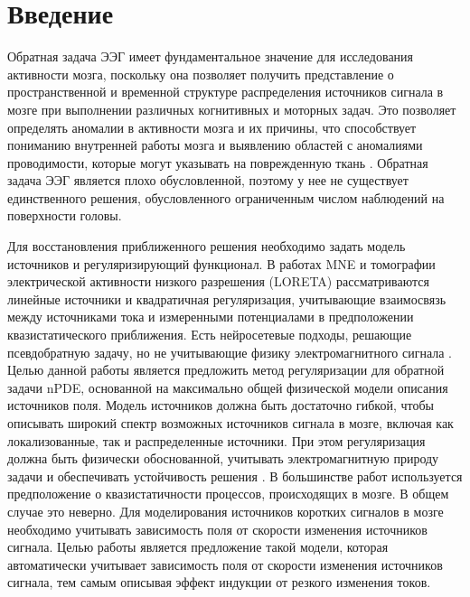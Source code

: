 \documentclass[a4paper,14pt,oneside,openany]{extarticle}
\begin{document}

%

\newpage


\newpage
\begingroup
\hypersetup{linkcolor=black}
\tableofcontents
\endgroup

\newpage
\section{Введение}

Обратная задача ЭЭГ имеет фундаментальное значение для исследования активности мозга, 
поскольку она позволяет получить представление о пространственной и временной структуре 
распределения источников сигнала в мозге при выполнении
различных когнитивных и моторных задач. Это позволяет определять аномалии в активности 
мозга и их причины, что способствует пониманию внутренней работы мозга и выявлению 
областей с аномалиями проводимости, которые могут указывать на 
поврежденную ткань \cite{PascualMarqui2001}. Обратная задача ЭЭГ является плохо обусловленной, 
поэтому у нее не существует единственного решения, обусловленного ограниченным 
числом наблюдений на поверхности головы.

Для восстановления приближенного решения необходимо задать модель источников 
и регуляризирующий функционал. В работах MNE \cite{Grech2008} и томографии 
электрической активности низкого разрешения (LORETA) \cite{Weinstein1999}
рассматриваются линейные источники и квадратичная регуляризация, 
учитывающие взаимосвязь между источниками тока и измеренными потенциалами в 
предположении квазистатического приближения. Есть нейросетевые подходы, 
решающие псевдобратную задачу, но не учитывающие физику электромагнитного сигнала \cite{Morik2024}.
Целью данной работы является предложить метод регуляризации для обратной 
задачи nPDE, основанной на максимально общей физической модели описания источников поля. 
Модель источников должна быть достаточно гибкой, чтобы описывать широкий спектр 
возможных источников сигнала в мозге, включая как локализованные, так и распределенные источники.
При этом регуляризация должна быть физически обоснованной, учитывать электромагнитную природу задачи 
и обеспечивать устойчивость решения \cite{Paraskevopoulou2023}.
В большинстве работ используется предположение о квазистатичности процессов, происходящих в мозге. 
В общем случае это неверно. Для моделирования источников коротких сигналов 
в мозге необходимо учитывать зависимость поля от скорости изменения источников сигнала.
Целью работы является предложение такой модели, которая автоматически учитывает
зависимость поля от скорости изменения источников сигнала, 
тем самым описывая эффект индукции от резкого изменения токов. 
\end{document}
